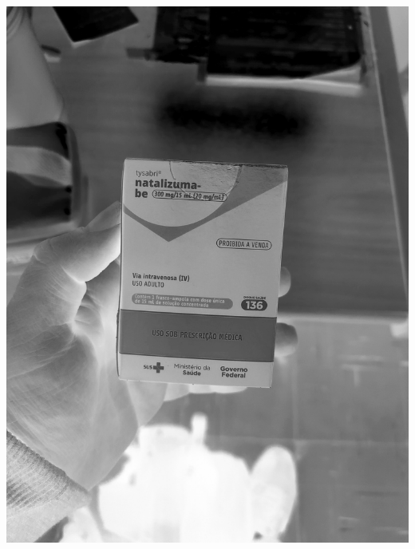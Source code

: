 \begin{frame}
\begin{columns}
\begin{column}{0.24\textwidth}
			\includegraphics[height=0.35\textheight]{../pictures/tysabri_cmyk_k_only.jpg}
			\\\vspace{\floatsep}

\end{column}
\end{columns}
\end{frame}
